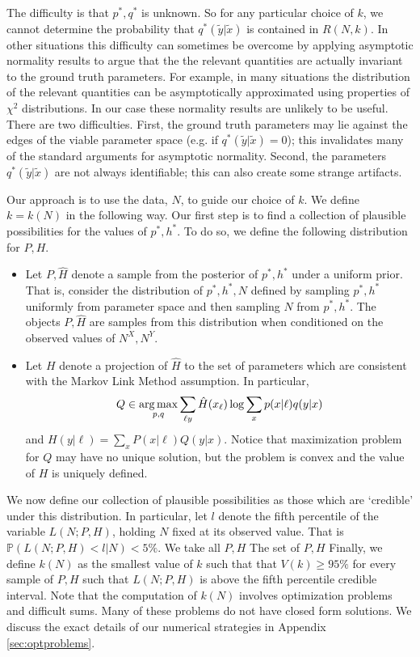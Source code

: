 \begin{itemize}
The difficulty is that $p^*,q^*$ is unknown.  So for any particular choice of $k$, we cannot determine the probability that $q^*(\tilde y|\tilde x)$ is contained in $R(N,k)$.   In other situations this difficulty can sometimes be overcome by applying asymptotic normality results to argue that the the relevant quantities are actually invariant to the ground truth parameters.  For example, in many situations the distribution of the relevant quantities can be asymptotically approximated using properties of $\chi^2$ distributions.  In our case these normality results are unlikely to be useful.  There are two difficulties.  First, the ground truth parameters may lie against the edges of the viable parameter space (e.g. if $q^*(\tilde y|\tilde x)=0$); this invalidates many of the standard arguments for asymptotic normality.  Second, the parameters $q^*(\tilde y|\tilde x)$ are not always identifiable; this can also create some strange artifacts.

Our approach is to use the data, $N$, to guide our choice of $k$.  We define $k=k(N)$ in the following way.  Our first step is to find a collection of plausible possibilities for the values of $p^*,h^*$.  To do so, we define the following distribution for $P,H$.  
%
\begin{itemize}
    \item Let $P,\hat H$ denote a sample from the posterior of $p^*,h^*$ under a uniform prior.  That is, consider the distribution of $p^*,h^*,N$ defined by sampling $p^*,h^*$ uniformly from parameter space and then sampling $N$ from $p^*,h^*$.  The objects $P,\hat H$ are samples from this distribution when conditioned on the observed values of $N^X,N^Y$.  
    \item Let $H$ denote a projection of $\hat H$ to the set of parameters which are consistent with the Markov Link Method assumption.  In particular, 
    \[
    Q \in \operatorname*{arg\,max}_{p,q} \sum_{\ell y} \hat H(x_\ell) \log \sum_x p(x|\ell) q(y|x)
    \] 
    and $H(y|\ell)=\sum_x P(x|\ell) Q(y|x)$.  Notice that maximization problem for $Q$ may have no unique solution, but the problem is convex and the value of $H$ is uniquely defined.
\end{itemize}
%
We now define our collection of plausible possibilities as those which are `credible' under this distribution.  In particular, let $l$ denote the fifth percentile of the variable $L(N;P,H)$, holding $N$ fixed at its observed value.  That is $\mathbb{P}(L(N;P,H)<l|N)<5\%$.  We take all $P,H$ The set of $P,H$ 
Finally, we define $k(N)$ as the smallest value of $k$ such that that $V(k)\geq 95\%$ for every sample of $P,H$ such that $L(N;P,H)$ is above the fifth percentile  credible interval.  Note that the computation of $k(N)$ involves optimization problems and difficult sums.  Many of these problems do not have closed form solutions.  We discuss the exact details of our numerical strategies in Appendix \ref{sec:optproblems}.


\end{itemize}
